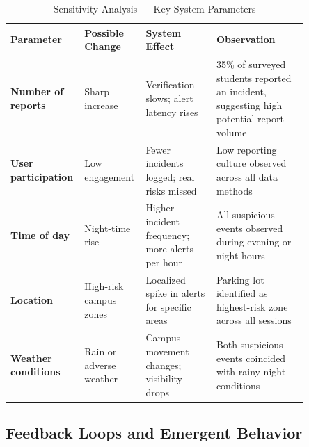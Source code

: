 \documentclass[12pt, onecolumn]{IEEEtran}
\begin{document}
\begin{table}[h]
\centering
\caption{Sensitivity Analysis --- Key System Parameters}
\label{tab:sensitivity}
\renewcommand{\arraystretch}{1.35}
\begin{tabular}{>{\bfseries\small}p{0.15\linewidth}
                >{\small}p{0.17\linewidth}
                >{\small}p{0.23\linewidth}
                >{\small}p{0.30\linewidth}}
\toprule
\textbf{Parameter} & \textbf{Possible Change} &
\textbf{System Effect} & \textbf{Observation} \\
\midrule
Number of reports
  & Sharp increase
  & Verification slows; alert latency rises
  & 35\% of surveyed students reported an incident, suggesting
    high potential report volume \\
\rowcolor{rowgray}
User participation
  & Low engagement
  & Fewer incidents logged; real risks missed
  & Low reporting culture observed across all data methods \\
Time of day
  & Night-time rise
  & Higher incident frequency; more alerts per hour
  & All suspicious events observed during evening or night hours \\
\rowcolor{rowgray}
Location
  & High-risk campus zones
  & Localized spike in alerts for specific areas
  & Parking lot identified as highest-risk zone across all sessions \\
Weather conditions
  & Rain or adverse weather
  & Campus movement changes; visibility drops
  & Both suspicious events coincided with rainy night conditions \\
\bottomrule
\end{tabular}
\end{table}

\subsection{Feedback Loops and Emergent Behavior}
\end{document}
